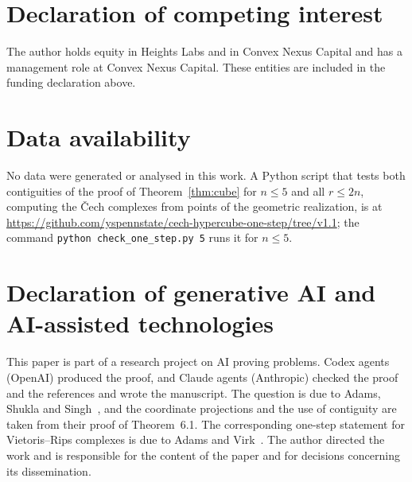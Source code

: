 \documentclass[11pt]{amsart}
\theoremstyle{remark}
\begin{document}
\section*{Declaration of competing interest}
The author holds equity in Heights Labs and in Convex Nexus Capital and has a management role at Convex Nexus Capital.
These entities are included in the funding declaration above.

\section*{Data availability}
No data were generated or analysed in this work. A Python script that tests both contiguities of the proof of
Theorem~\ref{thm:cube} for $n\le5$ and all $r\le2n$, computing the \v{C}ech complexes from points of the geometric
realization, is at \url{https://github.com/yspennstate/cech-hypercube-one-step/tree/v1.1}; the command
\texttt{python check\_one\_step.py 5} runs it for $n\le5$.

\section*{Declaration of generative AI and AI-assisted technologies}
This paper is part of a research project on AI proving problems. Codex agents (OpenAI) produced the proof, and Claude
agents (Anthropic) checked the proof and the references and wrote the manuscript. The question is due to Adams, Shukla
and Singh~\cite{ASS}, and the coordinate projections and the use of contiguity are taken from their proof of
Theorem~6.1. The corresponding one-step statement for Vietoris--Rips complexes is due to Adams and Virk~\cite{AV}. The
author directed the work and is responsible for the content of the paper and for decisions concerning
its dissemination.
\end{document}
